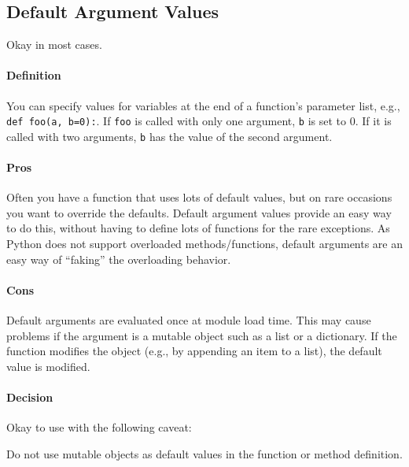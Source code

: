 \documentclass[
]{article}
\begin{document}
\subsection{Default Argument Values}

Okay in most cases.

\paragraph{Definition}

You can specify values for variables at the end of a function's
parameter list, e.g., \texttt{def\ foo(a,\ b=0):}. If \texttt{foo} is
called with only one argument, \texttt{b} is set to 0. If it is called
with two arguments, \texttt{b} has the value of the second argument.

\paragraph{Pros}

Often you have a function that uses lots of default values, but on rare
occasions you want to override the defaults. Default argument values
provide an easy way to do this, without having to define lots of
functions for the rare exceptions. As Python does not support overloaded
methods/functions, default arguments are an easy way of ``faking'' the
overloading behavior.

\paragraph{Cons}

Default arguments are evaluated once at module load time. This may cause
problems if the argument is a mutable object such as a list or a
dictionary. If the function modifies the object (e.g., by appending an
item to a list), the default value is modified.

\paragraph{Decision}

Okay to use with the following caveat:

Do not use mutable objects as default values in the function or method
definition.
\end{document}
